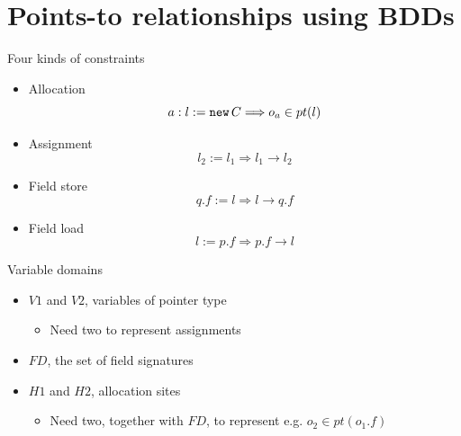 \documentclass{beamer}
\begin{document}
\section{Points-to relationships using BDDs}
\begin{frame}{Four kinds of constraints}
    \begin{itemize}
        \item Allocation
        $$ a: l := {\tt new} \, C \Longrightarrow o_a \in pt(l) $$
        \item Assignment
        $$ l_2 := l_1 \Longrightarrow l_1 \rightarrow l_2 $$
        \item Field store
        $$ q.f := l \Longrightarrow l \rightarrow q.f $$
        \item Field load
        $$ l := p.f \Longrightarrow p.f \rightarrow l $$
    \end{itemize}
\end{frame}

\begin{frame}{Variable domains}
\begin{itemize}
\item $V1$ and $V2$, variables of pointer type
  \begin{itemize} \item Need two to represent assignments \end{itemize}
\item $FD$, the set of field signatures
\item $H1$ and $H2$, allocation sites
  \begin{itemize} \item Need two, together with $FD$, to represent e.g.
  $o_2 \in pt(o_1.f)$ \end{itemize}
\end{itemize}
\end{frame}
\end{document}
